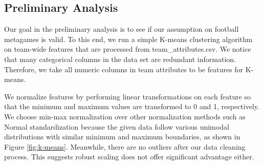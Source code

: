 \documentclass{article}
\begin{document}
\subsection{Preliminary Analysis}
Our goal in the preliminary analysis is to see if our assumption on football metagames is valid. To this end, we run a simple K-means clustering algorithm on team-wide features that are processed from team{\_}attributes.csv. We notice that many categorical columns in the data set are redundant information. Therefore, we take all numeric columns in team attributes to be features for K-means.

We normalize features by performing linear transformations on each feature so that the minimum and maximum values are transformed to 0 and 1, respectively. We choose min-max normalization over other normalization methods such as Normal standardization because the given data follow various unimodal distributions with similar minimum and maximum boundaries, as shown in Figure \ref{fig:k-means}. Meanwhile, there are no outliers after our data cleaning process. This suggests robust scaling does not offer significant advantage either.
\end{document}
